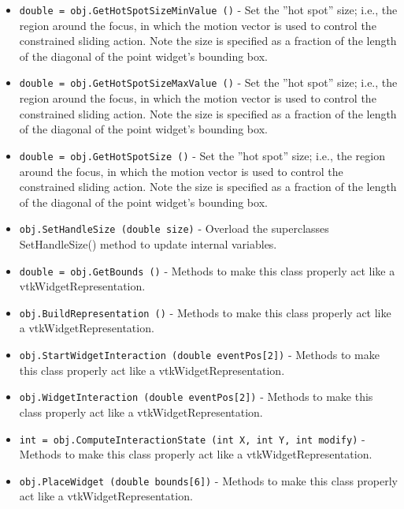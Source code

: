 \begin{itemize}
\item  \verb|double = obj.GetHotSpotSizeMinValue ()| -  Set the ''hot spot'' size; i.e., the region around the focus, in which the
 motion vector is used to control the constrained sliding action. Note the
 size is specified as a fraction of the length of the diagonal of the 
 point widget's bounding box.

\item  \verb|double = obj.GetHotSpotSizeMaxValue ()| -  Set the ''hot spot'' size; i.e., the region around the focus, in which the
 motion vector is used to control the constrained sliding action. Note the
 size is specified as a fraction of the length of the diagonal of the 
 point widget's bounding box.

\item  \verb|double = obj.GetHotSpotSize ()| -  Set the ''hot spot'' size; i.e., the region around the focus, in which the
 motion vector is used to control the constrained sliding action. Note the
 size is specified as a fraction of the length of the diagonal of the 
 point widget's bounding box.

\item  \verb|obj.SetHandleSize (double size)| -  Overload the superclasses SetHandleSize() method to update internal 
 variables.

\item  \verb|double = obj.GetBounds ()| -  Methods to make this class properly act like a vtkWidgetRepresentation.

\item  \verb|obj.BuildRepresentation ()| -  Methods to make this class properly act like a vtkWidgetRepresentation.

\item  \verb|obj.StartWidgetInteraction (double eventPos[2])| -  Methods to make this class properly act like a vtkWidgetRepresentation.

\item  \verb|obj.WidgetInteraction (double eventPos[2])| -  Methods to make this class properly act like a vtkWidgetRepresentation.

\item  \verb|int = obj.ComputeInteractionState (int X, int Y, int modify)| -  Methods to make this class properly act like a vtkWidgetRepresentation.

\item  \verb|obj.PlaceWidget (double bounds[6])| -  Methods to make this class properly act like a vtkWidgetRepresentation.


\end{itemize}

